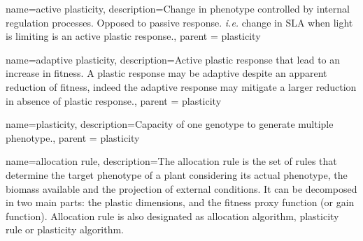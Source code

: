 
{
    name=active plasticity,
    description={Change in phenotype controlled by internal regulation processes. Opposed to passive response. \textit{i.e.} change in SLA when light is limiting is an active plastic response.},
    parent = plasticity
    }


{
    name=adaptive plasticity,
    description={Active plastic response that lead to an increase in fitness. A plastic response may be adaptive despite an apparent reduction of fitness, indeed the adaptive response may mitigate a larger reduction in absence of plastic response.},
    parent = plasticity
    }


{
    name=plasticity,
    description={Capacity of one genotype to generate multiple phenotype.},
    parent = plasticity
}

{
    name=allocation rule,
    description={The allocation rule is the set of rules that determine the target phenotype of a plant considering its actual phenotype, the biomass available and the projection of external conditions. It can be decomposed in two main parts: the plastic dimensions, and the fitness proxy function (or gain function). Allocation rule is also designated as allocation algorithm, plasticity rule or plasticity algorithm.}
}

